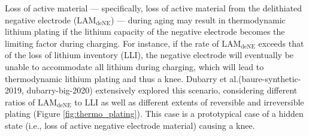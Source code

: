 \documentclass[journal=jpcl, manuscript=article, layout=onecolumn]{achemso}
\begin{document}
Loss of active material --- specifically, loss of active material from the delithiated negative electrode ($\mathrm{LAM_{deNE}}$) --- during aging may result in thermodynamic lithium plating if the lithium capacity of the negative electrode becomes the limiting factor during charging. For instance, if the rate of $\mathrm{LAM_{deNE}}$ exceeds that of the loss of lithium inventory (LLI), the negative electrode will eventually be unable to accommodate all lithium during charging, which will lead to thermodynamic lithium plating and thus a knee. Dubarry et al.\cite{ansean_operando_2017, dubarry_durability_2018}(baure-synthetic-2019, dubarry-big-2020) extensively explored this scenario, considering different ratios of $\mathrm{LAM_{deNE}}$ to LLI as well as different extents of reversible and irreversible plating (Figure \ref{fig:thermo_plating}). This case is a prototypical case of a hidden state (i.e., loss of active negative electrode material) causing a knee.
\end{document}

